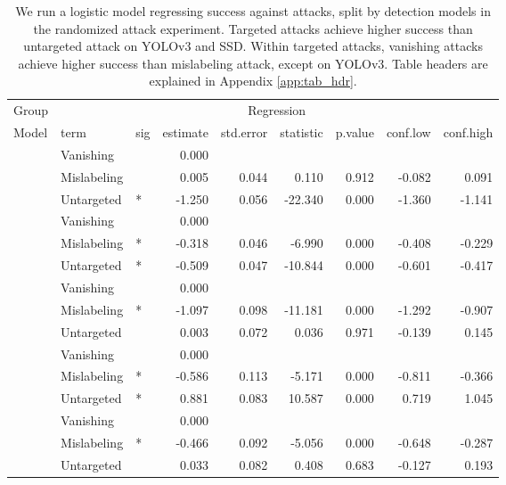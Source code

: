 \begingroup\fontsize{9}{11}\selectfont

\begin{longtable}[t]{lllrrrrrr}
\caption{\label{tab:target_untarget_vanish_mislabel_table}We run a logistic model regressing success against attacks, split by detection models in the randomized attack experiment. Targeted attacks achieve higher success than untargeted attack on YOLOv3 and SSD. Within targeted attacks, vanishing attacks achieve higher success than mislabeling attack, except on YOLOv3. Table headers are explained in Appendix \ref{app:tab_hdr}.}\\
\toprule
\multicolumn{1}{c}{Group} & \multicolumn{8}{c}{Regression} \\
\cmidrule(l{3pt}r{3pt}){1-1} \cmidrule(l{3pt}r{3pt}){2-9}
Model & term & sig & estimate & std.error & statistic & p.value & conf.low & conf.high\\
\midrule
 & Vanishing &  & 0.000 &  &  &  &  & \\
\cmidrule{2-9}\nopagebreak
 & Mislabeling &  & 0.005 & 0.044 & 0.110 & 0.912 & -0.082 & 0.091\\
\cmidrule{2-9}\nopagebreak
\multirow{-3}{*}{\raggedright\arraybackslash YOLOv3} & Untargeted & * & -1.250 & 0.056 & -22.340 & 0.000 & -1.360 & -1.141\\
\cmidrule{1-9}\pagebreak[0]
 & Vanishing &  & 0.000 &  &  &  &  & \\
\cmidrule{2-9}\nopagebreak
 & Mislabeling & * & -0.318 & 0.046 & -6.990 & 0.000 & -0.408 & -0.229\\
\cmidrule{2-9}\nopagebreak
\multirow{-3}{*}{\raggedright\arraybackslash SSD} & Untargeted & * & -0.509 & 0.047 & -10.844 & 0.000 & -0.601 & -0.417\\
\cmidrule{1-9}\pagebreak[0]
 & Vanishing &  & 0.000 &  &  &  &  & \\
\cmidrule{2-9}\nopagebreak
 & Mislabeling & * & -1.097 & 0.098 & -11.181 & 0.000 & -1.292 & -0.907\\
\cmidrule{2-9}\nopagebreak
\multirow{-3}{*}{\raggedright\arraybackslash RetinaNet} & Untargeted &  & 0.003 & 0.072 & 0.036 & 0.971 & -0.139 & 0.145\\
\cmidrule{1-9}\pagebreak[0]
 & Vanishing &  & 0.000 &  &  &  &  & \\
\cmidrule{2-9}\nopagebreak
 & Mislabeling & * & -0.586 & 0.113 & -5.171 & 0.000 & -0.811 & -0.366\\
\cmidrule{2-9}\nopagebreak
\multirow{-3}{*}{\raggedright\arraybackslash Faster R-CNN} & Untargeted & * & 0.881 & 0.083 & 10.587 & 0.000 & 0.719 & 1.045\\
\cmidrule{1-9}\pagebreak[0]
 & Vanishing &  & 0.000 &  &  &  &  & \\
\cmidrule{2-9}\nopagebreak
 & Mislabeling & * & -0.466 & 0.092 & -5.056 & 0.000 & -0.648 & -0.287\\
\cmidrule{2-9}\nopagebreak
\multirow{-3}{*}{\raggedright\arraybackslash Cascade R-CNN} & Untargeted &  & 0.033 & 0.082 & 0.408 & 0.683 & -0.127 & 0.193\\
\bottomrule
\end{longtable}
\endgroup{}

